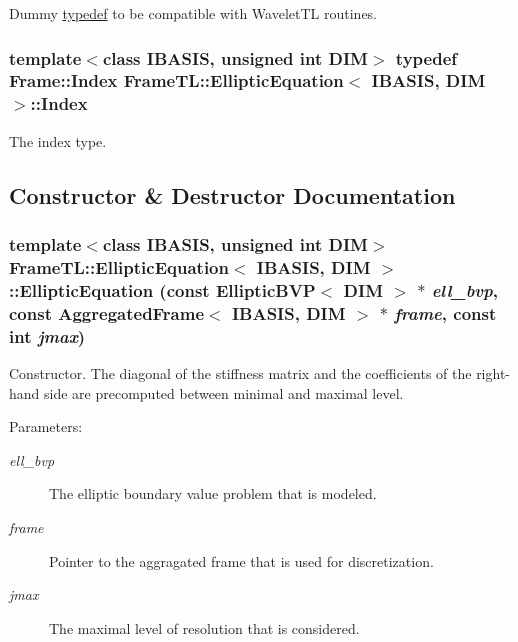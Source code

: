 Dummy \hyperlink{structtypedef}{typedef} to be compatible with WaveletTL routines. \hypertarget{classFrameTL_1_1EllipticEquation_598c5b4d850e49947abc0a253298e94c}{
\subsubsection[Index]{\setlength{\rightskip}{0pt plus 5cm}template$<$class IBASIS, unsigned int DIM$>$ {\bf typedef} {\bf Frame::Index} {\bf FrameTL::EllipticEquation}$<$ IBASIS, DIM $>$::{\bf Index}}}
\label{classFrameTL_1_1EllipticEquation_598c5b4d850e49947abc0a253298e94c}


The index type. 

\subsection{Constructor \& Destructor Documentation}
\hypertarget{classFrameTL_1_1EllipticEquation_44b302a82e544d16d49cf6b4dab933b0}{
\subsubsection[EllipticEquation]{\setlength{\rightskip}{0pt plus 5cm}template$<$class IBASIS, unsigned int DIM$>$ {\bf FrameTL::EllipticEquation}$<$ IBASIS, DIM $>$::{\bf EllipticEquation} (const EllipticBVP$<$ DIM $>$ $\ast$ {\em ell\_\-bvp}, \/  const {\bf AggregatedFrame}$<$ IBASIS, DIM $>$ $\ast$ {\em frame}, \/  const int {\em jmax})}}
\label{classFrameTL_1_1EllipticEquation_44b302a82e544d16d49cf6b4dab933b0}


Constructor. The diagonal of the stiffness matrix and the coefficients of the right-hand side are precomputed between minimal and maximal level.

\begin{Desc}
\item[Parameters:]
\begin{description}
\item[{\em ell\_\-bvp}]The elliptic boundary value problem that is modeled. \item[{\em frame}]Pointer to the aggragated frame that is used for discretization. \item[{\em jmax}]The maximal level of resolution that is considered. \end{description}
\end{Desc}


